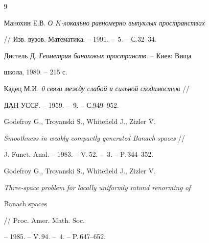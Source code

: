 \begin{thebibliography}{9}  


  




Манохин Е.В. {\em О $K$-локально равномерно выпуклых пространствах} 


// Изв. вузов. Математика. -- 1991. -- \No\,5. -- С.32--34. 




Дистель Д. {\em Геометрия банаховых пространств}. -- Киев: Вища 


школа, 1980. -- 215 с. 




Кадец М.И. {\em 0 связи между слабой и сильной сходимостью} // 


ДАН УССР. -- 1959. -- \No\,9. -- С.949--952. 




Godefroy G., Troyanski S., Whitefield J., Zizler V. 


{\em Smoothness in weakly compactly generated Banach spaces} // 


J. Funct. Anal. -- 1983. -- V.\,52. -- \No\,3. -- P.\,344--352. 




Godefroy G., Troyanski S., Whitefield J., Zizler V. 


{\em Three-space problem for locally uniformly rotund renorming of 


Banach spaces} // Proc. Amer. Math. Soc. 


-- 1985. -- V.\,94. -- \No\,4. -- P.\,647--652. 


 


\end{thebibliography}  


  


\vskip 2cm  


  






 


  


 


 



